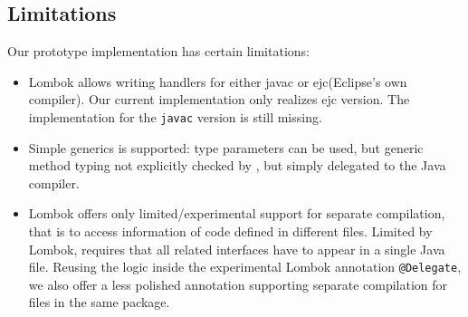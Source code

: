 \subsection{Limitations}
Our prototype implementation has certain limitations:
\begin{itemize}
\item Lombok allows writing handlers for either javac or ejc(Eclipse's own compiler).
Our current implementation only realizes ejc version. The implementation for
  the \texttt{javac} version is still missing.
\item Simple generics is supported:
type parameters can be used, but generic
method typing %
not explicitly checked by \mixin, but simply delegated to the Java compiler.
\item
Lombok offers only limited/experimental support for separate compilation, that is
to access information of code defined in different files.
Limited by Lombok, \mixin 
requires that all
  related interfaces have to appear in a single Java file.
Reusing the logic inside the experimental Lombok annotation \lstinline{@Delegate},
we also offer a less polished annotation supporting
separate compilation for files in the same package.
\end{itemize}



